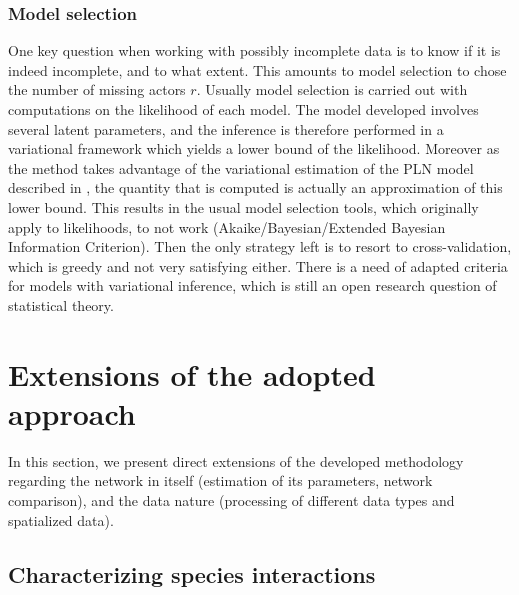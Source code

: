 \subsubsection*{Model selection}
One key question when working with possibly incomplete data is to know if it is indeed incomplete, and to what extent. This amounts to model selection to chose the number of missing actors $r$.  Usually model selection is carried out with computations on the likelihood of each model. The model developed involves several latent parameters, and the inference is therefore performed in a variational framework which yields a lower bound of the likelihood. Moreover as the method takes advantage of the variational estimation of the PLN model described in \citet{CMR18}, the quantity that is computed is actually an approximation of this lower bound. This results in the usual model selection tools, which originally apply to likelihoods, to not work (Akaike/Bayesian/Extended Bayesian Information Criterion). Then the only strategy left is to resort to cross-validation, which is greedy and not very satisfying either. There is a need of  adapted criteria for  models with variational inference, which is still an open research question of statistical theory.

\section{Extensions of the adopted approach}
In this section, we present direct extensions of the developed methodology regarding the network in itself (estimation of its parameters, network comparison), and the data nature (processing of different data types and spatialized data).
\subsection{Characterizing species interactions}


